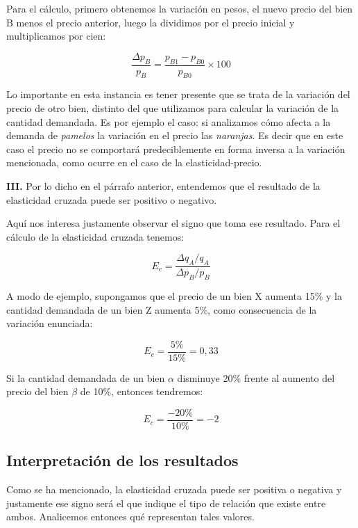 \documentclass[12pt,a4paper]{article}
\begin{document}
Para el cálculo, primero obtenemos la variación en pesos, el nuevo precio del bien B menos el precio anterior, luego la dividimos por el precio inicial y multiplicamos por cien:

\[
\frac{\Delta p_B}{p_B} = \frac{p_{B1} - p_{B0}}{p_{B0}} \times 100
\]

Lo importante en esta instancia es tener presente que se trata de la variación del precio de otro bien, distinto del que utilizamos para calcular la variación de la cantidad demandada. Es por ejemplo el caso: si analizamos cómo afecta a la demanda de \textit{pamelos} la variación en el precio las \textit{naranjas}. Es decir que en este caso el precio no se comportará predeciblemente en forma inversa a la variación mencionada, como ocurre en el caso de la elasticidad-precio.

\textbf{III.} Por lo dicho en el párrafo anterior, entendemos que el resultado de la elasticidad cruzada puede ser positivo o negativo.

Aquí nos interesa justamente observar el signo que toma ese resultado. Para el cálculo de la elasticidad cruzada tenemos:

\[
E_c = \frac{\Delta q_A / q_A}{\Delta p_B / p_B}
\]

A modo de ejemplo, supongamos que el precio de un bien X aumenta 15\% y la cantidad demandada de un bien Z aumenta 5\%, como consecuencia de la variación enunciada:

\[
E_c = \frac{5\%}{15\%} = 0,33
\]

Si la cantidad demandada de un bien $\alpha$ disminuye 20\% frente al aumento del precio del bien $\beta$ de 10\%, entonces tendremos:

\[
E_c = \frac{-20\%}{10\%} = -2
\]

\subsection{Interpretación de los resultados}

Como se ha mencionado, la elasticidad cruzada puede ser positiva o negativa y justamente ese signo será el que indique el tipo de relación que existe entre ambos. Analicemos entonces qué representan tales valores.
\end{document}
